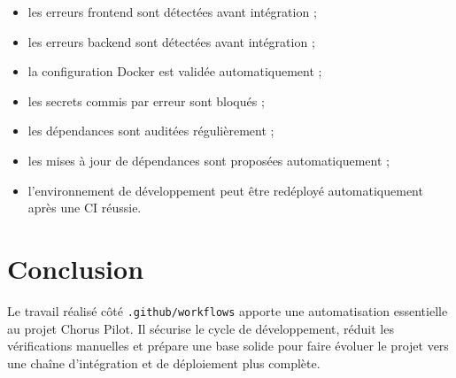 \documentclass[11pt,a4paper]{article}
\begin{document}
\begin{itemize}
  \item les erreurs frontend sont détectées avant intégration ;
  \item les erreurs backend sont détectées avant intégration ;
  \item la configuration Docker est validée automatiquement ;
  \item les secrets commis par erreur sont bloqués ;
  \item les dépendances sont auditées régulièrement ;
  \item les mises à jour de dépendances sont proposées automatiquement ;
  \item l'environnement de développement peut être redéployé automatiquement
        après une CI réussie.
\end{itemize}

\section{Conclusion}

Le travail réalisé côté \texttt{.github/workflows} apporte une automatisation
essentielle au projet Chorus Pilot. Il sécurise le cycle de développement,
réduit les vérifications manuelles et prépare une base solide pour faire évoluer
le projet vers une chaîne d'intégration et de déploiement plus complète.
\end{document}
